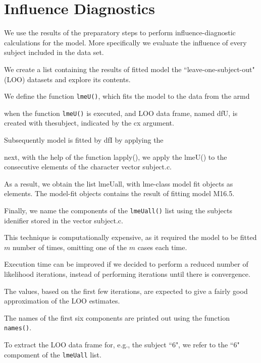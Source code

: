 \documentclass[a4paper,12pt]{article}
\begin{document}

\section{Influence Diagnostics}

We use the results of the preparatory steps to perform influence-diagnostic calculations for the model.
More specifically we evaluate the influence of every subject included in the data set.


We create a list containing the results of fitted model the ``leave-one-subject-out" (LOO)
datasets and explore its contents.

We define the function \texttt{lmeU()}, which fits the model to the data from the armd

when the function \texttt{lmeU()} is executed, and LOO data frame, named dfU, is created with thesubject, indicated by the cx argument.

Subsequently model is fitted by dfI by applying the 


next, with the help of the function lapply(), we apply the lmeU() to the consecutive elements of the character vector subject.c.

As a result, we obtain the list lmeUall, with lme-class model fit objects as elements. The model-fit objects contains the result of fitting model
M16.5.

Finally, we name the components of the \texttt{lmeUall()} list using the subjects idenifier stored in the vector subject.c.

This technique is computationally expensive, as it required the model to be fitted $m$ number of times, omitting one of the $m$ cases each time.

Execution time can be improved if we decided to perform a reduced number of likelihood iterations, instead of performing iterations until there is convergence.

The values, based on the first few iterations, are expected to give a fairly good approximation of the LOO estimates.


The names of the first six components are printed out using the function \texttt{names()}.

To extract the LOO data frame for, e.g., the subject ``6", we refer to the ``6" compoment of the
\texttt{lmeUall} list.
\end{document}
